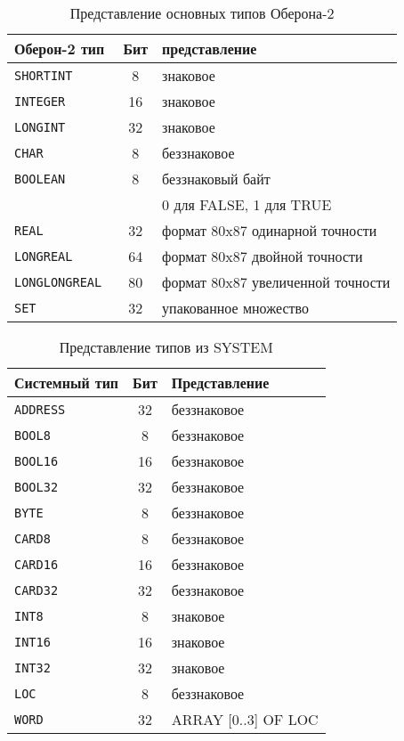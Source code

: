 \begin{table}
\begin{tabular}{|l|c|l|} \hline
\bf Оберон-2  тип  & \bf Бит &\bf представление \\ \hline
\tt SHORTINT       & 8        & знаковое \\
\tt INTEGER        & 16       & знаковое \\
\tt LONGINT        & 32       & знаковое \\
\tt CHAR           & 8        & беззнаковое \\
\tt BOOLEAN        & 8        & беззнаковый байт \\
                   &          & 0 для FALSE, 1 для TRUE \\
\tt REAL           & 32    & формат 80x87 одинарной точности \\
\tt LONGREAL       & 64    & формат 80x87 двойной точности \\
\tt LONGLONGREAL   & 80    & формат 80x87 увеличенной точности \\
\tt SET            & 32       & упакованное множество \\
\hline
\end{tabular}
\caption{Представление основных типов Оберона-2}\label{table:o2:rep}
\end{table}

\begin{table}
\begin{tabular}{|l|c|l|} \hline
\bf Системный тип & \bf Бит  &\bf Представление \\ \hline
\tt ADDRESS      & 32    & беззнаковое   \\
\tt BOOL8        & 8     & беззнаковое \\
\tt BOOL16       & 16     & беззнаковое \\
\tt BOOL32       & 32    & беззнаковое \\
\tt BYTE         & 8     & беззнаковое  \\
\tt CARD8        & 8     & беззнаковое \\
\tt CARD16       & 16    & беззнаковое \\
\tt CARD32       & 32    & беззнаковое \\
\tt INT8         & 8     & знаковое \\
\tt INT16        & 16    & знаковое \\
\tt INT32        & 32    & знаковое \\
\tt LOC          & 8     & беззнаковое  \\
\tt WORD         & 32    & ARRAY [0..3] OF LOC  \\
\hline
\end{tabular}
\caption{Представление типов из SYSTEM}\label{table:system:rep}
\end{table}

